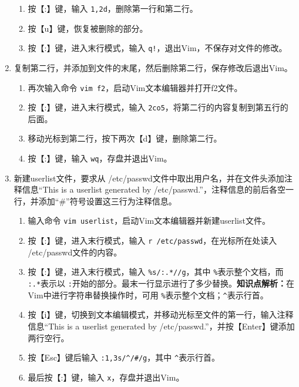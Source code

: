 \begin{enumerate}
\begin{enumerate}
      \item 按【:】键，输入 \verb|1,2d|，删除第一行和第二行。
      \item 按【u】键，恢复被删除的部分。
      \item 按【:】键，进入末行模式，输入 \verb|q!|，退出Vim，不保存对文件的修改。
    \end{enumerate}
  \item 复制第二行，并添加到文件的末尾，然后删除第二行，保存修改后退出Vim。
    \begin{enumerate}
      \item 再次输入命令 \verb|vim f2|，启动Vim文本编辑器并打开f2文件。
      \item 按【:】键，进入末行模式，输入 \verb|2co5|，将第二行的内容复制到第五行的后面。
      \item 移动光标到第二行，按下两次【d】键，删除第二行。
      \item 按【:】键，输入 \verb|wq|，存盘并退出Vim。
    \end{enumerate}
  \item 新建userlist文件，要求从 /etc/passwd文件中取出用户名，并在文件头添加注释信息“This is a userlist generated by /etc/passwd.”，注释信息的前后各空一行，并添加“\#”符号设置这三行为注释信息。
    \begin{enumerate}
      \item 输入命令 \verb|vim userlist|，启动Vim文本编辑器并新建userlist文件。
      \item 按【:】键，进入末行模式，输入 \verb|r /etc/passwd|，在光标所在处读入 /etc/passwd文件的内容。
      \item 按【:】键，进入末行模式，输入 \verb|%s/:.*//g|，其中 \verb|%|表示整个文档，而 \verb|:.*|表示以 \verb|:|开始的部分。最末一行显示进行了多少替换。\textbf{知识点解析：}在Vim中进行字符串替换操作时，可用 \verb|%|表示整个文档；\verb|^|表示行首。
      \item 按【i】键，切换到文本编辑模式，并移动光标至文件的第一行，输入注释信息“This is a userlist generated by /etc/passwd.”，并按【Enter】键添加两行空行。
      \item 按【Esc】键后输入 \verb|:1,3s/^/#/g|，其中 \verb|^|表示行首。
      \item 最后按【:】键，输入 \verb|x|，存盘并退出Vim。
    \end{enumerate}
\end{enumerate}

